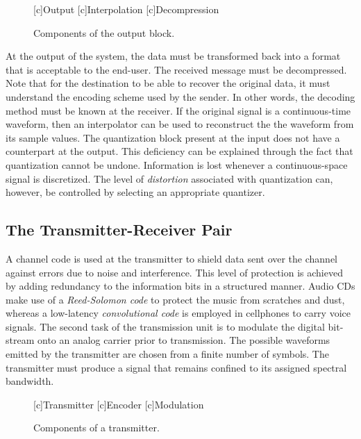 \begin{figure}[htbp]
\begin{center}
\begin{psfrags}
[c]{Output}
[c]{Interpolation}
[c]{Decompression}
\end{psfrags}
\end{center}
\caption{Components of the output block.}
\label{figure:BlockOutput}
\end{figure}

At the output of the system, the data must be transformed back into a format that is acceptable to the end-user.
The received message must be decompressed.
Note that for the destination to be able to recover the original data, it must understand the encoding scheme used by the sender.
In other words, the decoding method must be known at the receiver.
If the original signal is a continuous-time waveform, then an interpolator can be used to reconstruct the the waveform from its sample values.
The quantization block present at the input does not have a counterpart at the output.
This deficiency can be explained through the fact that quantization cannot be undone.
Information is lost whenever a continuous-space signal is discretized.
The level of \emph{distortion} associated with quantization can, however, be controlled by selecting an appropriate quantizer.


\subsection{The Transmitter-Receiver Pair}

A channel code is used at the transmitter to shield data sent over the channel against errors due to noise and interference.
This level of protection is achieved by adding redundancy to the information bits in a structured manner.
Audio CDs make use of a \emph{Reed-Solomon code} to protect the music from scratches and dust, whereas a low-latency \emph{convolutional code} is employed in cellphones to carry voice signals.
The second task of the transmission unit is to modulate the digital bit-stream onto an analog carrier prior to transmission.
The possible waveforms emitted by the transmitter are chosen from a finite number of symbols.
The transmitter must produce a signal that remains confined to its assigned spectral bandwidth.

\begin{figure}[htbp]
\begin{center}
\begin{psfrags}
[c]{Transmitter}
[c]{Encoder}
[c]{Modulation}
\end{psfrags}
\end{center}
\caption{Components of a transmitter.}
\label{figure:BlockTransmitter}
\end{figure}

